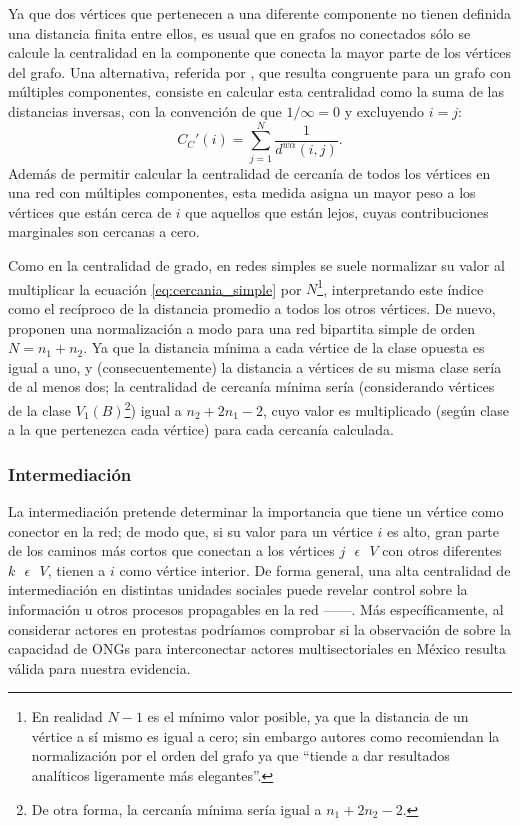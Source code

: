 \documentclass[letterpaper, 11pt]{book}
\theoremstyle{definition}
\theoremstyle{remark}
\begin{document}
Ya que dos vértices que pertenecen a una diferente componente no tienen definida una distancia finita entre ellos, es usual que en grafos no conectados sólo se calcule la centralidad en la componente que conecta la mayor parte de los vértices del grafo. 
Una alternativa, referida por \citet{2010_Newman_Networks}, que resulta congruente para un grafo con múltiples componentes, consiste en calcular esta centralidad como la suma de las distancias inversas, con la convención de que $1/\infty =0$ y excluyendo $i=j$: 
\begin{equation}\label{eq:cercaniaAjustada2}
    C_{C}'(i) = \sum_{j=1}^{N} \frac{1}{d^{w \alpha}(i,j)}.
\end{equation}
Además de permitir calcular la centralidad de cercanía de todos los vértices en una red con múltiples componentes, esta medida asigna un mayor peso a los vértices que están cerca de $i$ que aquellos que están lejos, cuyas contribuciones marginales son cercanas a cero. 

Como en la centralidad de grado, en redes simples se suele normalizar su valor al multiplicar la ecuación \ref{eq:cercania_simple} por $N$\footnote{
    En realidad $N-1$ es el mínimo valor posible, ya que la distancia de un vértice a sí mismo es igual a cero; sin embargo autores como \citet{2010_Newman_Networks} recomiendan la normalización por el orden del grafo ya que ``tiende a dar resultados analíticos ligeramente más elegantes''.
}, interpretando este índice como el recíproco de la distancia promedio a todos los otros vértices. 
De nuevo, \citet{1997_Borgatti_2ModeSNA} proponen una normalización a modo para una red bipartita simple de orden $N = n_{1}+n_{2}$. 
Ya que la distancia mínima a cada vértice de la clase opuesta es igual a uno, y (consecuentemente) la distancia a vértices de su misma clase sería de al menos dos; la centralidad de cercanía mínima sería (considerando vértices de la clase $V_{1}(B)$\footnote{
    De otra forma, la cercanía mínima sería igual a $n_{1}+2n_{2}-2$. 
}) igual a $n_{2}+2n_{1}-2$, cuyo valor es multiplicado (según clase a la que pertenezca cada vértice) para cada cercanía calculada.



\subsubsection{Intermediación}
La intermediación pretende determinar la importancia que tiene un vértice como conector en la red; de modo que, si su valor para un vértice $i$ es alto, gran parte de los caminos más cortos que conectan a los vértices $j \text{ } \epsilon \text{ } V$ con otros diferentes $k \text{ } \epsilon \text{ } V$, tienen a $i$ como vértice interior.
De forma general, una alta centralidad de intermediación en distintas unidades sociales puede revelar control sobre la información u otros procesos propagables en la red ---\citet{2010_Newman_Networks}---. 
Más específicamente, al considerar actores en protestas podríamos comprobar si la observación de \citet{2003_Wada_Tesis} sobre la capacidad de ONGs para interconectar actores multisectoriales en México resulta válida para nuestra evidencia. 
\end{document}
